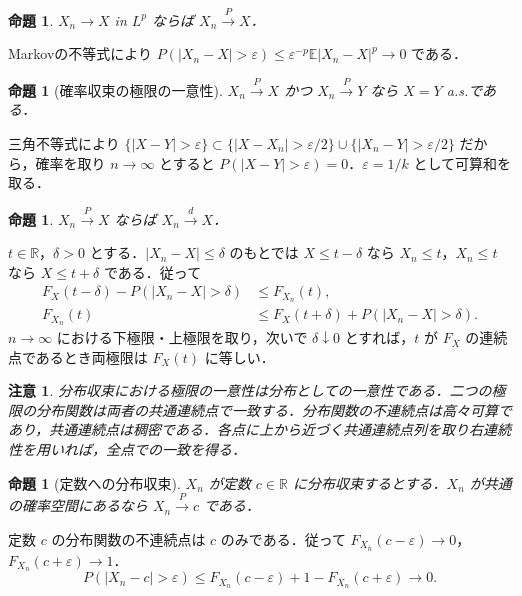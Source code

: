 \documentclass[a5paper,10pt,onecolumn]{jsarticle}
\makeatletter
\theoremstyle{mathnotetheorem}
\newtheorem{proposition}[theorem]{命題}
\newtheorem{remark}[theorem]{注意}
\renewcommand{\proofname}{証明}
\renewenvironment{proof}[1][\proofname]{%
  \par\pushQED{\qed}\normalfont\topsep4\p@\@plus2\p@\relax
  \trivlist\item[\hskip\labelsep\bfseries #1]\ignorespaces
}{\popQED\endtrivlist\@endpefalse}
\newcommand{\R}{\mathbb{R}}
\newcommand{\E}{\mathbb E}
\newcommand{\1}{\mathbf{1}}
\makeatother
\begin{document}
\begin{proposition}\label{lpprob}
$X_n\to X$ in $L^p$ ならば $X_n\xrightarrow{P}X$．
\end{proposition}
\begin{proof}
Markovの不等式により $P(|X_n-X|>\varepsilon)\le\varepsilon^{-p}\E|X_n-X|^p\to0$ である．
\end{proof}
\begin{proposition}[確率収束の極限の一意性]
$X_n\xrightarrow{P}X$ かつ $X_n\xrightarrow{P}Y$ なら $X=Y$ a.s.である．
\end{proposition}
\begin{proof}
三角不等式により $\{|X-Y|>\varepsilon\}\subset\{|X-X_n|>\varepsilon/2\}\cup\{|X_n-Y|>\varepsilon/2\}$ だから，確率を取り $n\to\infty$ とすると $P(|X-Y|>\varepsilon)=0$．$\varepsilon=1/k$ として可算和を取る．
\end{proof}
\begin{proposition}\label{probd}
$X_n\xrightarrow{P}X$ ならば $X_n\xrightarrow{d}X$．
\end{proposition}
\begin{proof}
$t\in\R$，$\delta>0$ とする．$|X_n-X|\le\delta$ のもとでは $X\le t-\delta$ なら $X_n\le t$，$X_n\le t$ なら $X\le t+\delta$ である．従って
\begin{align*}
 F_X(t-\delta)-P(|X_n-X|>\delta)&\le F_{X_n}(t),\\
 F_{X_n}(t)&\le F_X(t+\delta)+P(|X_n-X|>\delta).
\end{align*}
$n\to\infty$ における下極限・上極限を取り，次いで $\delta\downarrow0$ とすれば，$t$ が $F_X$ の連続点であるとき両極限は $F_X(t)$ に等しい．
\end{proof}
\begin{remark}
分布収束における極限の一意性は分布としての一意性である．二つの極限の分布関数は両者の共通連続点で一致する．分布関数の不連続点は高々可算であり，共通連続点は稠密である．各点に上から近づく共通連続点列を取り右連続性を用いれば，全点での一致を得る．
\end{remark}
\begin{proposition}[定数への分布収束]
$X_n$ が定数 $c\in\R$ に分布収束するとする．$X_n$ が共通の確率空間にあるなら $X_n\xrightarrow{P}c$ である．
\end{proposition}
\begin{proof}
定数 $c$ の分布関数の不連続点は $c$ のみである．従って $F_{X_n}(c-\varepsilon)\to0$，$F_{X_n}(c+\varepsilon)\to1$．
\[
 P(|X_n-c|>\varepsilon)\le F_{X_n}(c-\varepsilon)
 +1-F_{X_n}(c+\varepsilon)\to0.
\]
\end{proof}
\end{document}
